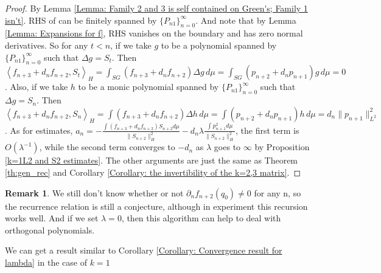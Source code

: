\documentclass[12pt]{amsart}
\makeatletter
\renewcommand*{\eqref}[1]{%
  \hyperref[{#1}]{\textup{\tagform@{\ref*{#1}}}}%
}
\theoremstyle{plain}
\theoremstyle{definition}
\newtheorem{remark}{Remark}[section]
\newcommand{\inner}[2]{\left \langle #1, #2\right \rangle}
\newcommand{\lap}{\Delta}
\makeatother
\begin{document}
\begin{proof}
By Lemma \ref{Lemma: Family 2 and 3 is self contained on Green's; Family 1 isn't}. RHS of \eqref{recurrencek=1} can be finitely spanned by $\{P_{n1}\}_{n=0}^{\infty}$. And note
that by Lemma \ref{Lemma: Expansions for f}, RHS vanishes on the boundary and has zero normal derivatives. So for any $t<n$, if we take $g$
to be a polynomial spanned by $\{P_{n1}\}_{n=0}^{\infty}$ such that $\lap g=S_t$. Then $\inner
{f_{n+3}+d_nf_{n+2}}{S_t}_H=\int_{SG}(f_{n+3}+d_nf_{n+2})\lap g\, d\mu=\int_{SG} (p_{n+2}+d_np_{n+1})g\,
d\mu=0$. Also, if we take $h$ to be a monic polynomial spanned by $\{P_{n1}\}_{n=0}^{\infty}$ such that $\lap
g=S_{n}$. Then $\inner{f_{n+3}+d_nf_{n+2}}{S_{n}}_H=\int (f_{n+3}+d_nf_{n+2})\lap h\, d\mu=\int
(p_{n+2}+d_np_{n+1}) h\, d\mu= d_n \|p_{n+1}\|_{L^2}^2$. As for estimates, $a_n=-\frac{\int (f_{n+3}+d_nf_{n+2})S_{n+2}d\mu}{\|S_{n+2}\|^2_H}-d_n\lambda\frac{\int p^2_{n+1}d\mu}{\|S_{n+2}\|^2_H}$, the first term is $O(\lambda^{-1})$, while the second term converges to $-d_n$ as $\lambda$ goes to $\infty$ by Proposition \ref{k=1L2 and S2 estimates}. The other
arguments are just the same as Theorem \ref{th:gen_rec} and Corollary \ref{Corollary: the invertibility of the k=2,3 matrix}.
\end{proof}
\begin{remark}
We still don't know whether or not $\partial_n f_{n+2}(q_0)\neq 0$ for any n, so the recurrence relation is still a conjecture, although in experiment this recursion works well. And if we set $\lambda=0$, then this algorithm can help to deal with orthogonal polynomials.
\end{remark}

We can get a result similar to Corollary \ref{Corollary: Convergence result for lambda} in the case of $k=1$
\end{document}
